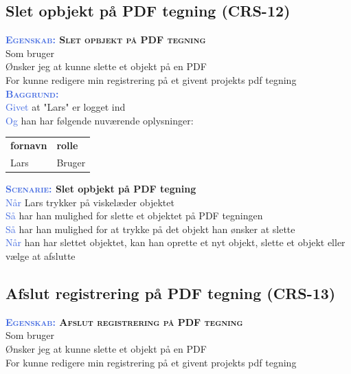 \subsection{Slet opbjekt på PDF tegning (CRS-12)} \label{sec:USSletObjekt}
\textbf{\textsc{\textcolor{RoyalBlue}{Egenskab:} Slet opbjekt på PDF tegning}}\\
Som bruger\\
Ønsker jeg at kunne slette et objekt på en PDF\\
For kunne redigere min registrering på et givent projekts pdf tegning\\

\textsc{\textcolor{RoyalBlue}{\textbf{Baggrund:}}}\\
\textcolor{RoyalBlue}{Givet} at "Lars" er logget ind\\
\textcolor{RoyalBlue}{Og} han har følgende nuværende oplysninger:\\
\begin{tabular}{| l | l |}
	\textbf{fornavn} & \textbf{rolle} \\
	Lars & Bruger\\
\end{tabular}

\textbf{\textsc{\textcolor{RoyalBlue}{Scenarie:}} Slet opbjekt på PDF tegning}\\
\textcolor{RoyalBlue}{Når} Lars trykker på viskelæder objektet\\
\textcolor{RoyalBlue}{Så}  har han mulighed for slette et objektet på PDF tegningen\\
\textcolor{RoyalBlue}{Så}  har han mulighed for at trykke på det objekt han ønsker at slette\\
\textcolor{RoyalBlue}{Når} han har slettet objektet, kan han oprette et nyt objekt, slette et objekt eller vælge at afslutte \\

\subsection{Afslut registrering på PDF tegning (CRS-13)} \label{sec:USAfslutRegPåPDF}
\textbf{\textsc{\textcolor{RoyalBlue}{Egenskab:} Afslut registrering på PDF tegning}}\\
Som bruger\\
Ønsker jeg at kunne slette et objekt på en PDF\\
For kunne redigere min registrering på et givent projekts pdf tegning\\

